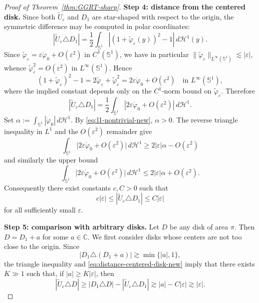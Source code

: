 \documentclass[a4paper,11pt,reqno]{amsart}
\numberwithin{equation}{section}
\theoremstyle{plain} %
\theoremstyle{definition} %
\theoremstyle{remark}
\newcommand{\C}{\mathbb{C}}
\begin{document}
\begin{proof}[Proof of Theorem~\ref{thm:GGRT-sharp}]
\medskip
\noindent
{\bf Step 4: distance from the centered disk.} Since both $\widetilde U_\varepsilon$ and $D_1$ are star-shaped with respect to
the origin, the symmetric difference may be computed in polar coordinates:
\[
|\widetilde U_\varepsilon \triangle D_1|
=
\frac12\int_{\mathbb S^1}
\left|(1+\widetilde\varphi_\varepsilon(y))^2-1\right|
\,d\mathcal H^1(y).
\]
Since \(\widetilde\varphi_\varepsilon=\varepsilon\dot\varphi_0+O(\varepsilon^2)\)
in \(C^1(\mathbb S^1)\), we have in particular
\(\|\widetilde\varphi_\varepsilon\|_{L^\infty(\mathbb S^1)}\lesssim |\varepsilon|\),
whence \(\widetilde\varphi_\varepsilon^2=O(\varepsilon^2)\) in
\(L^\infty(\mathbb S^1)\). Hence
\[
(1+\widetilde\varphi_\varepsilon)^2-1
=
2\widetilde\varphi_\varepsilon+\widetilde\varphi_\varepsilon^2
=
2\varepsilon \dot\varphi_0 + O(\varepsilon^2)
\quad \text{in } L^\infty(\mathbb S^1),
\]
where the implied constant depends only on the \(C^1\)-norm bound on
\(\widetilde\varphi_\varepsilon\). Therefore
\[
|\widetilde U_\varepsilon \triangle D_1|
=
\frac12\int_{\mathbb S^1}
\left|2\varepsilon \dot\varphi_0 + O(\varepsilon^2)\right|
\,d\mathcal H^1.
\]
Set \(\alpha:=\int_{\mathbb S^1}|\dot\varphi_0|\,d\mathcal H^1\). By
\eqref{eq:l1-nontrivial-new}, \(\alpha>0\). The reverse triangle inequality in
\(L^1\) and the \(O(\varepsilon^2)\) remainder give
\[
\int_{\mathbb S^1}\bigl|2\varepsilon\dot\varphi_0+O(\varepsilon^2)\bigr|\,d\mathcal H^1
\geq
2|\varepsilon|\alpha-O(\varepsilon^2)
\]
and similarly the upper bound
\[
\int_{\mathbb S^1}\bigl|2\varepsilon\dot\varphi_0+O(\varepsilon^2)\bigr|\,d\mathcal H^1
\leq
2|\varepsilon|\alpha+O(\varepsilon^2).
\]
Consequently there exist constants $c,C>0$ such that
\begin{equation}\label{eq:distance-centered-disk-new}
c|\varepsilon|
\leq
|\widetilde U_\varepsilon \triangle D_1|
\leq
C|\varepsilon|
\end{equation}
for all sufficiently small $\varepsilon$.

\medskip
\noindent
{\bf Step 5: comparison with arbitrary disks.} Let $D$ be any disk of area $\pi$. Then $D=D_1+a$ for some $a\in \C$. We first consider disks whose centers are not too close to the origin.
Since
\[
|D_1\triangle (D_1+a)|
\gtrsim \min\{|a|,1\},
\]
the triangle inequality and \eqref{eq:distance-centered-disk-new} imply that
there exists $K\gg 1$ such that, if $|a|\geq K|\varepsilon|$, then
\begin{equation}\label{eq:far-disks-new}
|\widetilde U_\varepsilon \triangle D|
\geq
|D_1\triangle D|-|\widetilde U_\varepsilon\triangle D_1|
\gtrsim
|a|-C|\varepsilon|
\gtrsim
|\varepsilon|.
\end{equation}


\end{proof}
\end{document}
